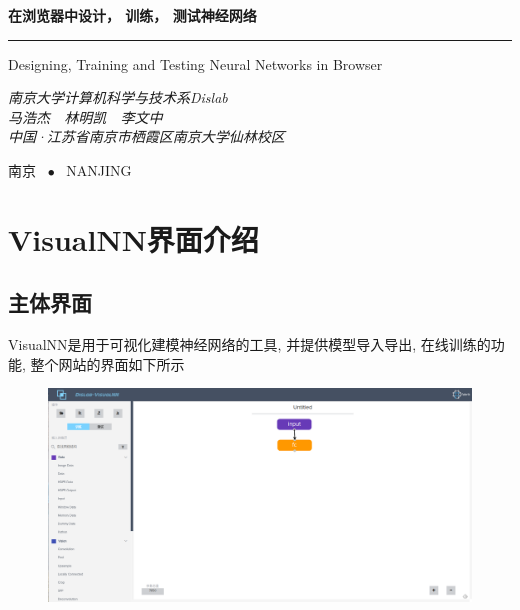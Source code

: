\documentclass{progbookcn}
\begin{document}
\begin{titlepage}
  \vspace*{25ex}

  \hspace{0.05\textwidth}\begin{minipage}{.9\textwidth}
    \flushright

    {\textbf{在浏览器中设计， 训练， 测试神经网络}}

    \rule{\linewidth}{.5pt}

    \vspace{2ex}

    {\textsf{Designing, Training and Testing Neural Networks in Browser}} \\

    \vspace{20ex}

    {\textit{南京大学计算机科学与技术系Dislab}}\\
    {\textit{马浩杰~~林明凯~~李文中}}\\
    {\textit{中国·江苏省南京市栖霞区南京大学仙林校区}}\\
  \end{minipage}

  \vfill

  \centering
  {南京 ~$\bullet$ ~NANJING}
\end{titlepage}
\thispagestyle{empty}


\frontmatter


\clearpage
{
  \hypersetup{hidelinks}
  \tableofcontents
}


\mainmatter

\part{VisualNN界面介绍}


\chapter{主体界面}

VisualNN是用于可视化建模神经网络的工具, 并提供模型导入导出, 在线训练的功能, 整个网站的界面如下所示

\begin{figure}[H]
  \centering
  \includegraphics[width=0.98\linewidth]{screenshot.png}
\end{figure}
\end{document}
